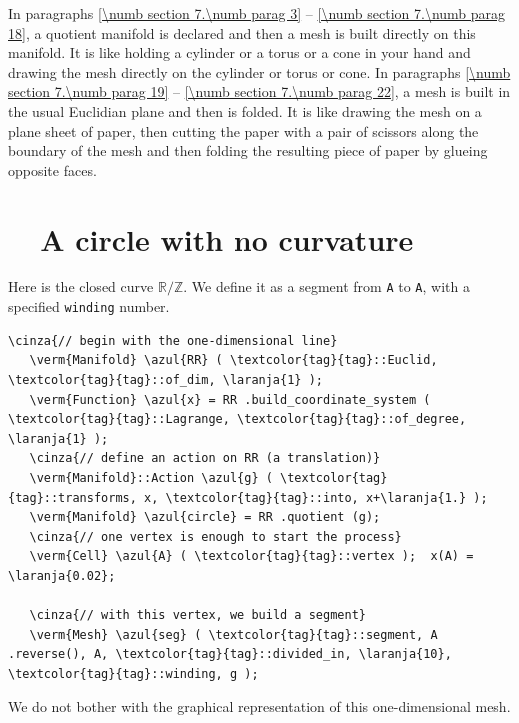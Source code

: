 In paragraphs \ref{\numb section 7.\numb parag 3} -- \ref{\numb section 7.\numb parag 18},
a quotient manifold is declared and then a mesh is built directly on this manifold.
It is like holding a cylinder or a torus or a cone in your hand and drawing the mesh
directly on the cylinder or torus or cone.
In paragraphs \ref{\numb section 7.\numb parag 19} -- \ref{\numb section 7.\numb parag 22},
a mesh is built in the usual Euclidian plane and then is folded.
It is like drawing the mesh on a plane sheet of paper, then cutting the paper with a pair of
scissors along the boundary of the mesh and then folding the resulting piece of paper
by glueing opposite faces.


\section{~~A circle with no curvature}\label{\numb section 7.\numb parag 1}

Here is the closed curve $ \mathbb{R}/{\mathbb Z} $.
We define it as a segment from {\small\tt A} to {\small\tt A}, with a specified
{\small\tt winding} number.

\begin{Verbatim}[commandchars=\\\{\},formatcom=\small\tt,frame=single,
   label=parag-\ref{\numb section 7.\numb parag 1}.cpp,rulecolor=\color{moldura},
   baselinestretch=0.94,framesep=2mm                                            ]
   \cinza{// begin with the one-dimensional line}
   \verm{Manifold} \azul{RR} ( \textcolor{tag}{tag}::Euclid, \textcolor{tag}{tag}::of_dim, \laranja{1} );
   \verm{Function} \azul{x} = RR .build_coordinate_system ( \textcolor{tag}{tag}::Lagrange, \textcolor{tag}{tag}::of_degree, \laranja{1} );
   \cinza{// define an action on RR (a translation)}
   \verm{Manifold}::Action \azul{g} ( \textcolor{tag}{tag}::transforms, x, \textcolor{tag}{tag}::into, x+\laranja{1.} );
   \verm{Manifold} \azul{circle} = RR .quotient (g);
   \cinza{// one vertex is enough to start the process}
   \verm{Cell} \azul{A} ( \textcolor{tag}{tag}::vertex );  x(A) = \laranja{0.02};

   \cinza{// with this vertex, we build a segment}
   \verm{Mesh} \azul{seg} ( \textcolor{tag}{tag}::segment, A .reverse(), A, \textcolor{tag}{tag}::divided_in, \laranja{10}, \textcolor{tag}{tag}::winding, g );
\end{Verbatim}

We do not bother with the graphical representation of this one-dimensional mesh.

